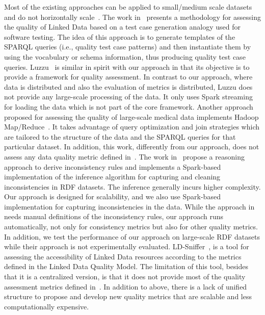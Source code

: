 Most of the existing approaches can be applied to small/medium scale datasets and do not horizontally scale~\cite{debattista2016luzzu,KontokostasWAHLCZ14}. 
The work in~\cite{KontokostasWAHLCZ14} presents a methodology for assessing the quality of Linked Data based on a test case generation analogy used for software testing. 
The idea of this approach is to generate templates of the SPARQL queries (i.e., quality test case patterns) and then instantiate them by using the vocabulary or schema information, thus producing quality test case queries. 
Luzzu~\cite{debattista2016luzzu} is similar in spirit with our approach in that its objective is to provide a framework for quality assessment. 
In contrast to our approach, where data is distributed and also the evaluation of metrics is distributed, Luzzu does not provide any large-scale processing of the data. 
It only uses Spark streaming for loading the data which is not part of the core framework. 
Another approach proposed for assessing the quality of large-scale medical data implements Hadoop Map/Reduce~\cite{BonnerMKBTMCA15}. 
It takes advantage of query optimization and join strategies which are tailored to the structure of the data and the SPARQL queries for that particular dataset. In addition, this work, differently from our approach, does not assess any data quality metric defined in~\cite{zaveri2015quality}.
The work in~\cite{BenbernouO17} propose a reasoning approach to derive inconsistency rules and implements a Spark-based implementation of the inference algorithm for capturing and cleaning inconsistencies in RDF datasets. 
The inference generally incurs higher complexity. Our approach is designed for scalability, and we also use Spark-based implementation for capturing inconsistencies in the data. While the approach in~\cite{BenbernouO17} needs manual definitions of the inconsistency rules, our approach runs automatically, not only for consistency metrics but also for other quality metrics. 
In addition, we test the performance of our approach on large-scale RDF datasets while their approach is not experimentally evaluated. 
LD-Sniffer~\cite{Mihindukulasooriya2016LDSA}, is a tool for assessing the accessibility of Linked Data resources according to the metrics defined in the Linked Data Quality Model. 
The limitation of this tool, besides that it is a centralized version, is that it does not provide most of the quality assessment metrics defined in~\cite{zaveri2015quality}. 
In addition to above, there is a lack of unified structure to propose and develop new quality metrics that are scalable and less computationally expensive.

